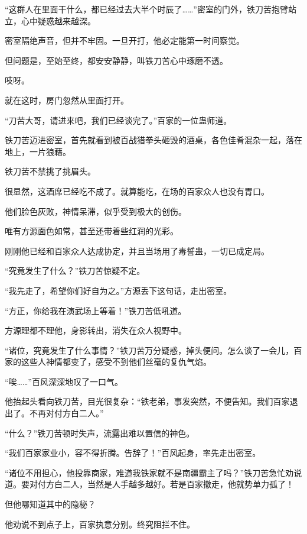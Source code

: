 
\begin{this_body}

“这群人在里面干什么，都已经过去大半个时辰了……”密室的门外，铁刀苦抱臂站立，心中疑惑越来越深。

密室隔绝声音，但并不牢固。一旦开打，他必定能第一时间察觉。

但问题是，至始至终，都安安静静，叫铁刀苦心中琢磨不透。

吱呀。

就在这时，房门忽然从里面打开。

“刀苦大哥，请进来吧，我们已经谈完了。”百家的一位蛊师道。

铁刀苦迈进密室，首先就看到被百战猎拳头砸毁的酒桌，各色佳肴混杂一起，落在地上，一片狼藉。

铁刀苦不禁挑了挑眉头。

很显然，这酒席已经吃不成了。就算能吃，在场的百家众人也没有胃口。

他们脸色灰败，神情呆滞，似乎受到极大的创伤。

唯有方源面色如常，甚至还带着些红润的光彩。

刚刚他已经和百家众人达成协定，并且当场用了毒誓蛊，一切已成定局。

“究竟发生了什么？”铁刀苦惊疑不定。

“我先走了，希望你们好自为之。”方源丢下这句话，走出密室。

“方正，你给我在演武场上等着！”铁刀苦低吼道。

方源理都不理他，身影转出，消失在众人视野中。

“诸位，究竟发生了什么事情？”铁刀苦万分疑惑，掉头便问。怎么谈了一会儿，百家的这些人神情都变了，感受不到他们丝毫的复仇气焰。

“唉……”百风深深地叹了一口气。

他抬起头看向铁刀苦，目光很复杂：“铁老弟，事发突然，不便告知。我们百家退出了。不再对付方白二人。”

“什么？”铁刀苦顿时失声，流露出难以置信的神色。

“我们百家家业小，容不得折腾。告辞了！”百风起身，率先走出密室。

“诸位不用担心，他投靠商家，难道我铁家就不是南疆霸主了吗？”铁刀苦急忙劝说道。要对付方白二人，当然是人手越多越好。若是百家撤走，他就势单力孤了！

但他哪知道其中的隐秘？

他劝说不到点子上，百家执意分别。终究阻拦不住。


\end{this_body}

